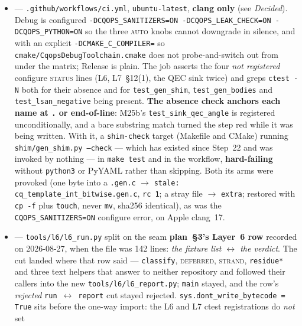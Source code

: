 \begin{itemize}[leftmargin=1.5em,itemsep=4pt,topsep=4pt,parsep=0pt]
\item {} --- \texttt{.github/workflows/ci.yml}, \texttt{ubuntu-latest},
      \textbf{clang only} (see \emph{Decided}). Debug is configured
      \texttt{-DCQOPS\_SANITIZERS=ON -DCQOPS\_LEAK\_CHECK=ON -DCQOPS\_PYTHON=ON}
      so the three \textsc{auto} knobs cannot downgrade in silence, and with an
      explicit \texttt{-DCMAKE\_C\_COMPILER=} so
      \texttt{cmake/CqopsDebugToolchain.cmake} does not probe-and-switch out from
      under the matrix; Release is plain. The job asserts the four
      \emph{not registered} configure \textsc{status} lines (L6, L7~§12(1), the
      QEC sink twice) and greps \texttt{ctest -N} both for their absence and for
      \texttt{test\_gen\_shim}, \texttt{test\_gen\_bodies} and
      \texttt{test\_lsan\_negative} being present. \textbf{The absence check
      anchors each name at \texttt{.} or end-of-line}: M25b's
      \texttt{test\_sink\_qec\_angle} is registered unconditionally, and a bare
      substring match turned the step red while it was being written. With it, a
      \texttt{shim-check} target (Makefile and CMake) running
      \texttt{shim/gen\_shim.py --check} --- which has existed since Step~22 and
      was invoked by nothing --- in \texttt{make test} and in the workflow,
      \textbf{hard-failing} without \texttt{python3} or PyYAML rather than
      skipping. Both its arms were provoked (one byte into a \texttt{.gen.c} $\to$
      \texttt{stale: cq\_template\_int\_bitwise.gen.c}, \texttt{rc 1}; a stray
      file $\to$ \texttt{extra}; restored with \texttt{cp -f} plus \texttt{touch},
      never \texttt{mv}, sha256 identical), as was the
      \texttt{CQOPS\_SANITIZERS=ON} configure error, on Apple clang~17.
\item {} --- \texttt{tools/l6/l6\_run.py} split on the seam
      \textbf{plan~§3's Layer~6 row} recorded on 2026-08-27, when the file was
      142 lines: \emph{the fixture list $\leftrightarrow$ the verdict}. The cut
      landed where that row said --- \texttt{classify}, \textsc{deferred},
      \textsc{strand}, \texttt{residue*} and three text helpers that answer to
      neither repository and followed their callers into the new
      \texttt{tools/l6/l6\_report.py}; \texttt{main} stayed, and the row's
      \emph{rejected} \texttt{run}~$\leftrightarrow$~\texttt{report} cut stayed
      rejected. \texttt{sys.dont\_write\_bytecode = True} sits before the one-way
      import: the L6 and L7 ctest registrations do \emph{not} set

\end{itemize}
